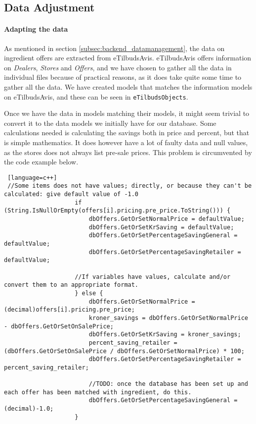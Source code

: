 \subsection{Data Adjustment}
\label{subsec:dataadjustment}

\paragraph{Adapting the data}
As mentioned in section \ref{subsec:backend_datamanagement}, the data on ingredient offers are extracted from eTilbudsAvis. eTilbudsAvis offers information on \textit{Dealers}, \textit{Stores} and \textit{Offers}, and we have chosen to gather all the data in individual files because of practical reasons, as it does take quite some time to gather all the data.  We have created models that matches the information models on eTilbudsAvis, and these can be seen in \texttt{eTilbudsObjects}.

Once we have the data in models matching their models, it might seem trivial to convert it to the data models we initially have for our database. Some calculations needed is calculating the savings both in price and percent, but that is simple mathematics. It does however have a lot of faulty data and null values, as the stores does not always list pre-sale prices. This problem is circumvented by the code example below.

\begin{lstlisting} [language=c++]
 //Some items does not have values; directly, or because they can't be calculated: give default value of -1.0
                    if (String.IsNullOrEmpty(offers[i].pricing.pre_price.ToString())) {
                        dbOffers.GetOrSetNormalPrice = defaultValue;
                        dbOffers.GetOrSetKrSaving = defaultValue;
                        dbOffers.GetOrSetPercentageSavingGeneral = defaultValue;
                        dbOffers.GetOrSetPercentageSavingRetailer = defaultValue;

                    //If variables have values, calculate and/or convert them to an appropriate format.
                    } else {
                        dbOffers.GetOrSetNormalPrice = (decimal)offers[i].pricing.pre_price;
                        kroner_savings = dbOffers.GetOrSetNormalPrice - dbOffers.GetOrSetOnSalePrice;
                        dbOffers.GetOrSetKrSaving = kroner_savings;
                        percent_saving_retailer = (dbOffers.GetOrSetOnSalePrice / dbOffers.GetOrSetNormalPrice) * 100;
                        dbOffers.GetOrSetPercentageSavingRetailer = percent_saving_retailer;

                        //TODO: once the database has been set up and each offer has been matched with ingredient, do this.
                        dbOffers.GetOrSetPercentageSavingGeneral = (decimal)-1.0;
                    }
\end{lstlisting}

